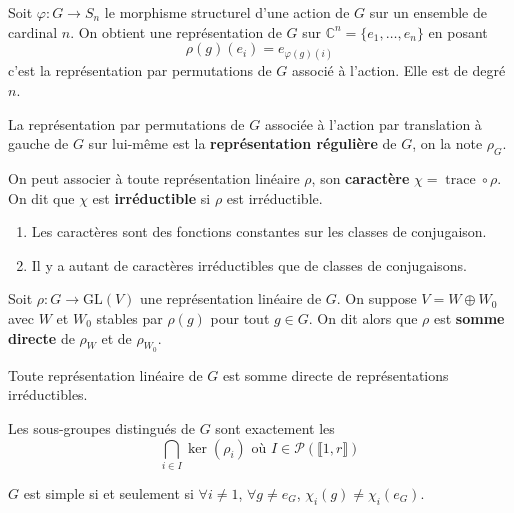 	\begin{example}
		Soit $\varphi : G \rightarrow S_n$ le morphisme structurel d'une action de $G$ sur un ensemble de cardinal $n$. On obtient une représentation de $G$ sur $\mathbb{C}^n = \{ e_1, \dots, e_n \}$ en posant
		\[ \rho(g)(e_i) = e_{\varphi(g)(i)} \]
		c'est la représentation par permutations de $G$ associé à l'action. Elle est de degré $n$.
	\end{example}

	\begin{definition}
		La représentation par permutations de $G$ associée à l'action par translation à gauche de $G$ sur lui-même est la \textbf{représentation régulière} de $G$, on la note $\rho_G$.
	\end{definition}


	\begin{definition}
		On peut associer à toute représentation linéaire $\rho$, son \textbf{caractère} $\chi = \operatorname{trace} \circ \rho$. On dit que $\chi$ est \textbf{irréductible} si $\rho$ est irréductible.
	\end{definition}

	\begin{proposition}
		\begin{enumerate}[label=(\roman*)]
			\item Les caractères sont des fonctions constantes sur les classes de conjugaison.
			\item Il y a autant de caractères irréductibles que de classes de conjugaisons.
		\end{enumerate}
	\end{proposition}

	\begin{definition}
		Soit $\rho : G \rightarrow \mathrm{GL}(V)$ une représentation linéaire de $G$. On suppose $V = W \oplus W_0$ avec $W$ et $W_0$ stables par $\rho(g)$ pour tout $g \in G$. On dit alors que $\rho$ est \textbf{somme directe} de $\rho_W$ et de $\rho_{W_0}$.
	\end{definition}

	\begin{theorem}[Maschke]
		Toute représentation linéaire de $G$ est somme directe de représentations irréductibles.
	\end{theorem}


	\begin{theorem}
		Les sous-groupes distingués de $G$ sont exactement les
		\[ \bigcap_{i \in I} \ker(\rho_i) \text{ où } I \in \mathcal{P}(\llbracket 1, r \rrbracket) \]
	\end{theorem}

	\begin{corollary}
		$G$ est simple si et seulement si $\forall i \neq 1$, $\forall g \neq e_G$, $\chi_i(g) \neq \chi_i(e_G)$.
	\end{corollary}

